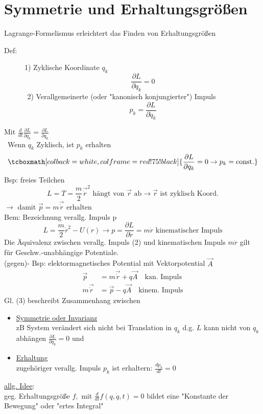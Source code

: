 \documentclass[titlepage,12pt,a4paper,ngerman]{report}
\newcommand{\tx}[1]{\textrm{#1}}
\newcommand{\rmbox}[1]{\tcboxmath[colback=white,colframe=red!75!black]{#1}} %
\renewcommand{\boxed}{\rmbox}
\begin{document}
{\section{Symmetrie und Erhaltungsgrößen}
Lagrange-Formelismus erleichtert das Finden von Erhaltungsgrößen
\begin{description}
	\item [Def:] 1) Zyklische Koordinate $q_k$
	$$\frac{\partial L}{\partial q_k} = 0$$
	$\ \,$2) Verallgemeinerte (oder "kanonisch konjungierter") Impuls
	$$p_k = \frac{\partial L}{\partial \dot q_k}$$
\end{description}
Mit $\frac{d}{dt}\frac{\partial L}{\partial \dot q_k} = \frac{\partial L}{\partial q_k}$\\\
Wenn $q_k$ Zyklisch, ist $p_k$ erhalten
$$\boxed{\frac{\partial L}{\partial q_k} = 0 \rightarrow p_k = \tx{const.}}$$
Bsp: freies Teilchen
$$L = T = \frac{m}{2} \vec{\dot r}^2 \tx{  hängt von }\vec{r} \tx{ ab} \rightarrow \vec{r} \tx{ ist zyklisch Koord.}$$
$\rightarrow$ damit $ \vec{p} = m \vec{\dot r}$ erhalten\\
Bem: Bezeichnung verallg. Impuls p
$$L = \frac{m}{2} \dot r^2 - U(r) \rightarrow p = \frac{\partial L}{\partial \dot r} = m \dot r \tx{ kinematischer Impuls}$$
Die Äquivalenz zwischen verallg. Impuls (2) und kinematischen Impuls $m \dot r$ gilt für Geschw.-unabhängige Potentiale.\\
(gegen)- Bsp: elektormagnetisches Potential mit Vektorpotential $\vec{A}$
\begin{align*}
\vec{p} &= m \vec{\dot r} + q \vec{A} \quad \tx{kan. Impuls}\\
m \vec{\dot r} &= \vec{p} - q \vec{A} \quad \tx{kinem. Impuls}
\end{align*}
Gl. (3) beschreibt Zusammenhang zwischen 
\begin{itemize}
	\item \underline{Symmetrie oder Invarianz}\\
	zB System verändert sich nicht bei Translation in $q_k$ d.g. $L$ kann nicht von $q_k$ abhängen $\frac{\partial L}{\partial q_k} = 0$ und
	\item \underline{Erhaltung}\\
	zugehöriger verallg. Impuls $p_k$ ist erhaltern: $\frac{dp_k}{dt} = 0$
\end{itemize}
\underline{allg. Idee}:\\
\indent geg. Erhaltungsgröße $f,$ mit $\frac{d}{dt} f (q, \dot q,t ) = 0$ bildet eine "Konstante der Bewegung" oder "ertes Integral"\\
}
\end{document}
